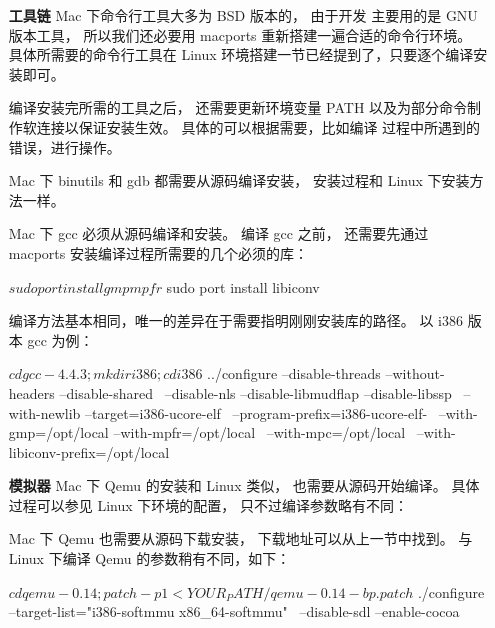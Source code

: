 \begin{small}
\begin{itemize}
    \item [{\bf{工具链}}] %
        Mac 下命令行工具大多为 BSD 版本的，
        由于开发 \ucore 主要用的是 GNU 版本工具，
        所以我们还必要用 macports 重新搭建一遍合适的命令行环境。
        具体所需要的命令行工具在 Linux 环境搭建一节已经提到了，只要逐个编译安装即可。

        编译安装完所需的工具之后，
        还需要更新环境变量 PATH 以及为部分命令制作软连接以保证安装生效。
        具体的可以根据需要，比如编译 \ucore 过程中所遇到的错误，进行操作。


        Mac 下 binutils 和 gdb 都需要从源码编译安装，
        安装过程和 Linux 下安装方法一样。

        Mac 下 gcc 必须从源码编译和安装。
        编译 gcc 之前，
        还需要先通过 macports 安装编译过程所需要的几个必须的库：
\begin{bashcode1}
$ sudo port install gmp mpfr
$ sudo port install libiconv
\end{bashcode1}
        编译方法基本相同，唯一的差异在于需要指明刚刚安装库的路径。
        以 i386 版本 gcc 为例：
\begin{bashcode1}
$ cd gcc-4.4.3; mkdir i386; cd i386
$ ../configure --disable-threads --without-headers --disable-shared \
          --disable-nls --disable-libmudflap --disable-libssp \
          --with-newlib --target=i386-ucore-elf \ 
          --program-prefix=i386-ucore-elf- \
          --with-gmp=/opt/local --with-mpfr=/opt/local \
          --with-mpc=/opt/local \
          --with-libiconv-prefix=/opt/local
\end{bashcode1}
    \item [{\bf{模拟器}}] %
        Mac 下 Qemu 的安装和 Linux 类似，
        也需要从源码开始编译。
        具体过程可以参见 Linux 下环境的配置，
        只不过编译参数略有不同：

        Mac 下 Qemu 也需要从源码下载安装，
        下载地址可以从上一节中找到。
        与 Linux 下编译 Qemu 的参数稍有不同，如下：
\begin{bashcode1}
$ cd qemu-0.14; patch -p1 < YOUR_PATH/qemu-0.14-bp.patch
$ ./configure --target-list="i386-softmmu x86_64-softmmu" \
          --disable-sdl --enable-cocoa
\end{bashcode1}
\end{itemize}
\end{small}

